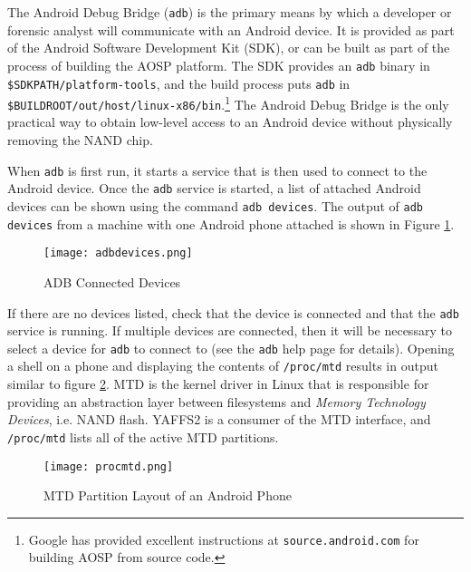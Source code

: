 The Android Debug Bridge (\texttt{adb}) is the primary means by which a developer or forensic analyst will communicate with an
Android device. It is provided as part of the Android Software Development Kit (SDK), or can be built as part of the process of
building the AOSP platform. The SDK provides an \texttt{adb} binary in \texttt{\$SDKPATH/platform-tools}, and the build process puts
\texttt{adb} in \texttt{\$BUILDROOT/out/host/linux-x86/bin}.\footnote{Google has provided excellent instructions at
\texttt{source.android.com} for building AOSP from source code.}  The Android Debug Bridge is the only practical way to obtain
low-level access to an Android device without physically removing the NAND chip.

When \texttt{adb} is first run, it starts a service that is then used to connect to the Android device. 
Once the \texttt{adb} service is started, a list of attached Android devices can be shown using the command \texttt{adb devices}. 
The output of \texttt{adb devices} from a machine with one Android phone attached is shown in Figure \ref{fig:adbdevices}.

\begin{figure}[ht]
\caption{ADB Connected Devices}
\begin{center}\texttt{[image: adbdevices.png]}\end{center}
\label{fig:adbdevices}
\end{figure}

If there are no devices listed, check that the device is connected and that the \texttt{adb} service is running.  If multiple devices
are connected, then it will be necessary to select a device for \texttt{adb} to connect to (see the \texttt{adb} help page for
details).  Opening a shell on a phone and displaying the contents of \texttt{/proc/mtd} results in output similar to figure
\ref{fig:mtd}.  MTD is the kernel driver in Linux that is responsible for providing an abstraction layer between filesystems and
\emph{Memory Technology Devices}, i.e. NAND flash. YAFFS2 is a consumer of the MTD interface, and \texttt{/proc/mtd} lists all of the active MTD
partitions. 

\begin{figure}[ht]
\caption{MTD Partition Layout of an Android Phone}
\begin{center}\texttt{[image: procmtd.png]}\end{center}
\label{fig:mtd}
\end{figure}	

